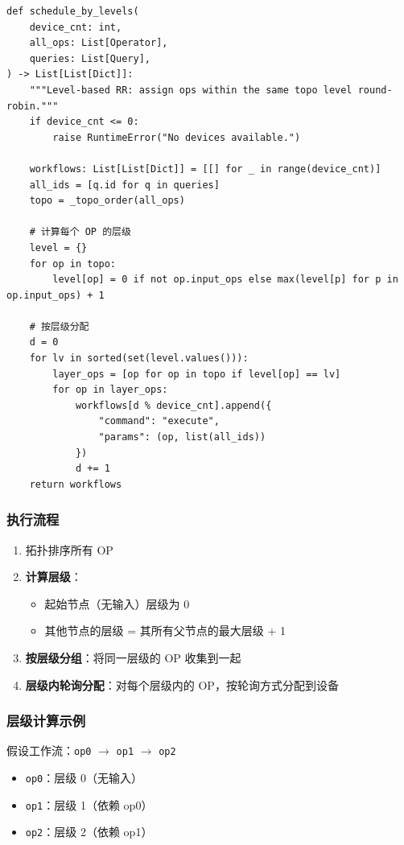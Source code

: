 \documentclass[12pt,a4paper]{article}
\begin{document}
\begin{lstlisting}
def schedule_by_levels(
    device_cnt: int,
    all_ops: List[Operator],
    queries: List[Query],
) -> List[List[Dict]]:
    """Level-based RR: assign ops within the same topo level round-robin."""
    if device_cnt <= 0:
        raise RuntimeError("No devices available.")
    
    workflows: List[List[Dict]] = [[] for _ in range(device_cnt)]
    all_ids = [q.id for q in queries]
    topo = _topo_order(all_ops)
    
    # 计算每个 OP 的层级
    level = {}
    for op in topo:
        level[op] = 0 if not op.input_ops else max(level[p] for p in op.input_ops) + 1
    
    # 按层级分配
    d = 0
    for lv in sorted(set(level.values())):
        layer_ops = [op for op in topo if level[op] == lv]
        for op in layer_ops:
            workflows[d % device_cnt].append({
                "command": "execute",
                "params": (op, list(all_ids))
            })
            d += 1
    return workflows
\end{lstlisting}

\subsubsection{执行流程}

\begin{enumerate}
    \item 拓扑排序所有 OP
    \item \textbf{计算层级}：
    \begin{itemize}
        \item 起始节点（无输入）层级为 0
        \item 其他节点的层级 = 其所有父节点的最大层级 + 1
    \end{itemize}
    \item \textbf{按层级分组}：将同一层级的 OP 收集到一起
    \item \textbf{层级内轮询分配}：对每个层级内的 OP，按轮询方式分配到设备
\end{enumerate}

\subsubsection{层级计算示例}

假设工作流：\texttt{op0} $\rightarrow$ \texttt{op1} $\rightarrow$ \texttt{op2}

\begin{itemize}
    \item \texttt{op0}：层级 0（无输入）
    \item \texttt{op1}：层级 1（依赖 op0）
    \item \texttt{op2}：层级 2（依赖 op1）
\end{itemize}
\end{document}
